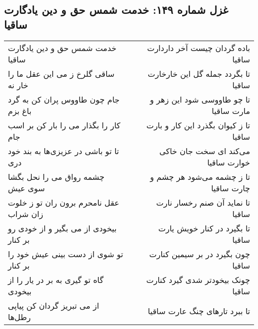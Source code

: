 \begin{center}
\section*{غزل شماره ۱۴۹: خدمت شمس حق و دین یادگارت ساقیا}
\label{sec:0149}
\begin{longtable}{l p{0.5cm} r}
خدمت شمس حق و دین یادگارت ساقیا
&&
باده گردان چیست آخر داردارت ساقیا
\\
ساقی گلرخ ز می این عقل ما را خار نه
&&
تا بگردد جمله گل این خارخارت ساقیا
\\
جام چون طاووس پران کن به گرد باغ بزم
&&
تا چو طاووسی شود این زهر و مارت ساقیا
\\
کار را بگذار می را بار کن بر اسب جام
&&
تا ز کیوان بگذرد این کار و بارت ساقیا
\\
تا تو باشی در عزیزی‌ها به بند خود دری
&&
می‌کند ای سخت جان خاکی خوارت ساقیا
\\
چشمه رواق می را نحل بگشا سوی عیش
&&
تا ز چشمه می‌شود هر چشم و چارت ساقیا
\\
عقل نامحرم برون ران تو ز خلوت زان شراب
&&
تا نماید آن صنم رخسار نارت ساقیا
\\
بیخودی از می بگیر و از خودی رو بر کنار
&&
تا بگیرد در کنار خویش یارت ساقیا
\\
تو شوی از دست بینی عیش خود را بر کنار
&&
چون بگیرد در بر سیمین کنارت ساقیا
\\
گاه تو گیری به بر در یار را از بیخودی
&&
چونک بیخودتر شدی گیرد کنارت ساقیا
\\
از می تبریز گردان کن پیاپی رطل‌ها
&&
تا ببرد تارهای چنگ عارت ساقیا
\\
\end{longtable}
\end{center}
